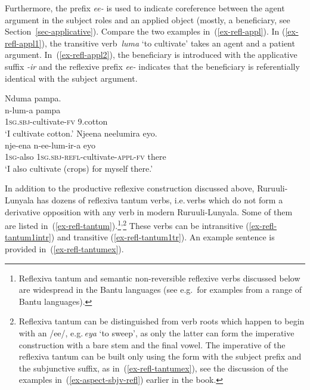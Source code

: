 Furthermore, the prefix \emph{ee-} is used to indicate coreference between the agent argument in the subject roles and an applied object (mostly, a beneficiary, see Section~\ref{sec-applicative}). 
Compare the two examples in~(\ref{ex-refl-appl}). In (\ref{ex-refl-appl1}), the transitive verb \emph{luma} `to cultivate' takes an agent and a patient argument. 
In~(\ref{ex-refl-appl2}), the beneficiary is introduced with the applicative suffix \emph{-ir} and the reflexive prefix \emph{ee-} indicates that the beneficiary is referentially identical with the subject argument.

\ea \label{ex-refl-appl}
\begin{xlist}
\ex \label{ex-refl-appl1}
	\glll Nduma 	pampa.\\
	  	n-lum-a 				pampa\\
		\textsc{1sg.sbj}-cultivate-\textsc{fv}		9.cotton\\
	\glt 	‘I cultivate cotton.’
\ex \label{ex-refl-appl2}
	\glll Njeena	neelumira						eyo.\\
		nje-ena	n-ee-lum-ir-a					eyo\\
		1\textsc{sg}-also	\textsc{1sg.sbj}-\textsc{refl}-cultivate-\textsc{appl}-\textsc{fv}	there\\
	\glt ‘I also cultivate (crops) for myself there.’
\end{xlist}
\z

In addition to the productive reflexive construction discussed above, Ru\-ruu\-li\hyp{}Lu\-nya\-la has dozens of reflexiva tantum verbs, i.e.\,verbs which do not form a derivative opposition with any verb in modern Ru\-ruu\-li\hyp{}Lu\-nya\-la. 
Some of them are listed in~(\ref{ex-refl-tantum}).\footnote{Reflexiva tantum and semantic non-reversible reflexive verbs discussed below are widespread in the Bantu languages (see e.g.\,\citealt{Marlo2015Exceptional} for examples from a range of Bantu languages).}\textsuperscript{,}\footnote{Reflexiva tantum can be distinguished from verb roots which happen to begin with an /ee/, e.g.\,\emph{eya} `to sweep', as only the latter can form the imperative construction with a bare stem and the final vowel. The imperative of the reflexiva tantum can be built only using the form with the subject prefix and the subjunctive suffix, as in~(\ref{ex-refl-tantumex}), see the discussion of the examples in~(\ref{ex-aspect-sbjv-refl}) earlier in the book.}
These verbs can be intransitive (\ref{ex-refl-tantum1intr}) and transitive (\ref{ex-refl-tantum1tr}). 
An example sentence is provided in~(\ref{ex-refl-tantumex}).

